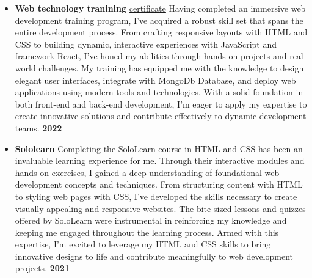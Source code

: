 \documentclass[letterpaper, 11pt]{article}
\newcommand{\secStartSpace}{\vspace{3pt}}
\newcommand{\secEndSpace}{\vspace{5pt}}
\begin{document}
\begin{addmargin}[1em]{1em}
\begin{itemize}[itemsep=-2.25pt]
             \item \textbf{Web technology tranining} \href{https://drive.google.com/file/d/1dvMJvl1GO1latdqQqoEhMXfEIaUzRKfI/view?usp=drivesdk}{\underline{certificate}}
             \newline
             \secStartSpace
             Having completed an immersive web development training program, I've acquired a robust skill set that spans the entire development process. From crafting responsive layouts with HTML and CSS to building dynamic, interactive experiences with JavaScript and framework React, I've honed my abilities through hands-on projects and real-world challenges. My training has equipped me with the knowledge to design elegant user interfaces, integrate with MongoDb Database, and deploy web applications using modern tools and technologies. With a solid foundation in both front-end and back-end development, I'm eager to apply my expertise to create innovative solutions and contribute effectively to dynamic development teams.
             \secEndSpace
             \hfill \textbf{2022}
             \item \textbf{Sololearn}
             \secStartSpace
             Completing the SoloLearn course in HTML and CSS has been an invaluable learning experience for me. Through their interactive modules and hands-on exercises, I gained a deep understanding of foundational web development concepts and techniques. From structuring content with HTML to styling web pages with CSS, I've developed the skills necessary to create visually appealing and responsive websites. The bite-sized lessons and quizzes offered by SoloLearn were instrumental in reinforcing my knowledge and keeping me engaged throughout the learning process. Armed with this expertise, I'm excited to leverage my HTML and CSS skills to bring innovative designs to life and contribute meaningfully to web development projects.
             \secEndSpace
             \hfill \textbf{2021}
	\end{itemize}
\end{addmargin}




\end{document}
